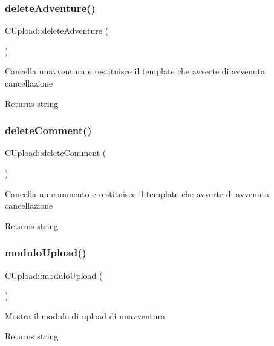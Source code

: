 \subsubsection{\texorpdfstring{delete\+Adventure()}{deleteAdventure()}}
{\footnotesize\ttfamily C\+Upload\+::delete\+Adventure (\begin{DoxyParamCaption}{ }\end{DoxyParamCaption})}

Cancella un\textquotesingle{}avventura e restituisce il template che avverte di avvenuta cancellazione

\begin{DoxyReturn}{Returns}
string 
\end{DoxyReturn}
\mbox{\label{class_c_upload_a2d55728314a2c6651d12ed58219f9212}} 
\subsubsection{\texorpdfstring{delete\+Comment()}{deleteComment()}}
{\footnotesize\ttfamily C\+Upload\+::delete\+Comment (\begin{DoxyParamCaption}{ }\end{DoxyParamCaption})}

Cancella un commento e restituisce il template che avverte di avvenuta cancellazione

\begin{DoxyReturn}{Returns}
string 
\end{DoxyReturn}
\mbox{\label{class_c_upload_aa1b51d44277cde35d64536dcb5f29355}} 
\subsubsection{\texorpdfstring{modulo\+Upload()}{moduloUpload()}}
{\footnotesize\ttfamily C\+Upload\+::modulo\+Upload (\begin{DoxyParamCaption}{ }\end{DoxyParamCaption})}

Mostra il modulo di upload di un\textquotesingle{}avventura

\begin{DoxyReturn}{Returns}
string 
\end{DoxyReturn}
\mbox{\label{class_c_upload_a8cc74e63124f1f9f2a368030597513d2}} 
